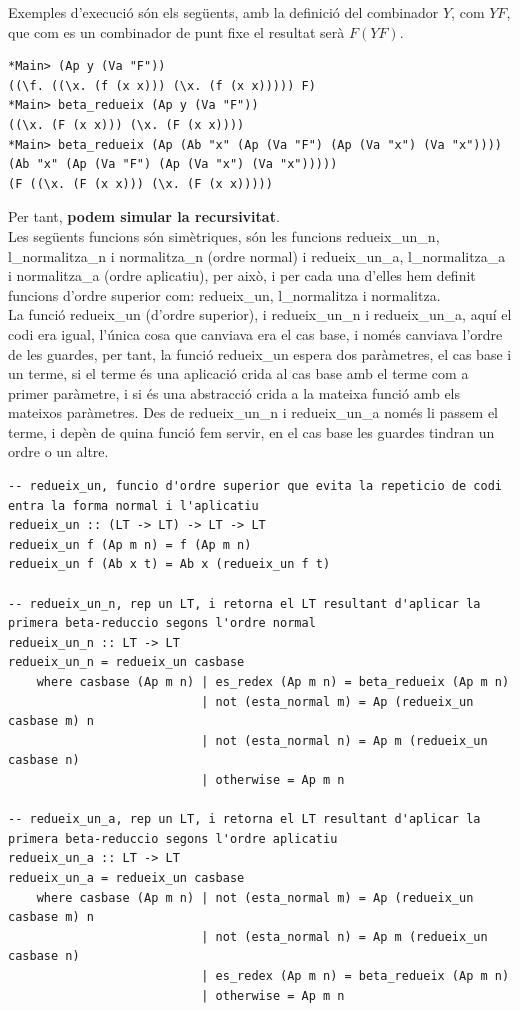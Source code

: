 \documentclass[10pt,a4paper]{article}
\begin{document}
Exemples d'execució són els següents, amb la definició del combinador $Y$, com $Y F$, que com es un combinador de punt fixe el resultat serà $F (Y F)$.

\lstset{language=Haskell, breaklines=true, basicstyle=\footnotesize}
\begin{lstlisting}[frame=mystyle]
*Main> (Ap y (Va "F"))
((\f. ((\x. (f (x x))) (\x. (f (x x))))) F)
*Main> beta_redueix (Ap y (Va "F"))
((\x. (F (x x))) (\x. (F (x x))))
*Main> beta_redueix (Ap (Ab "x" (Ap (Va "F") (Ap (Va "x") (Va "x")))) (Ab "x" (Ap (Va "F") (Ap (Va "x") (Va "x")))))
(F ((\x. (F (x x))) (\x. (F (x x)))))
\end{lstlisting}

Per tant, \textbf{podem simular la recursivitat}. \\

Les següents funcions són simètriques, són les funcions redueix\_un\_n, l\_normalitza\_n i normalitza\_n (ordre normal) i redueix\_un\_a, l\_normalitza\_a i normalitza\_a (ordre aplicatiu), per això, i per cada una d'elles hem definit funcions d'ordre superior com: redueix\_un, l\_normalitza i normalitza. \\

La funció redueix\_un (d'ordre superior), i redueix\_un\_n i redueix\_un\_a, aquí el codi era igual, l'única cosa que canviava era el cas base, i només canviava l'ordre de les guardes, per tant, la funció redueix\_un espera dos paràmetres, el cas base i un terme, si el terme és una aplicació crida al cas base amb el terme com a primer paràmetre, i si és una abstracció crida a la mateixa funció amb els mateixos paràmetres. Des de redueix\_un\_n i redueix\_un\_a només li passem el terme, i depèn de quina funció fem servir, en el cas base les guardes tindran un ordre o un altre.

\lstset{language=Haskell, breaklines=true, basicstyle=\footnotesize}
\begin{lstlisting}[frame=mystyle]
-- redueix_un, funcio d'ordre superior que evita la repeticio de codi entra la forma normal i l'aplicatiu
redueix_un :: (LT -> LT) -> LT -> LT
redueix_un f (Ap m n) = f (Ap m n)
redueix_un f (Ab x t) = Ab x (redueix_un f t)

-- redueix_un_n, rep un LT, i retorna el LT resultant d'aplicar la primera beta-reduccio segons l'ordre normal
redueix_un_n :: LT -> LT
redueix_un_n = redueix_un casbase
    where casbase (Ap m n) | es_redex (Ap m n) = beta_redueix (Ap m n)
                           | not (esta_normal m) = Ap (redueix_un casbase m) n
                           | not (esta_normal n) = Ap m (redueix_un casbase n)
                           | otherwise = Ap m n

-- redueix_un_a, rep un LT, i retorna el LT resultant d'aplicar la primera beta-reduccio segons l'ordre aplicatiu
redueix_un_a :: LT -> LT
redueix_un_a = redueix_un casbase
    where casbase (Ap m n) | not (esta_normal m) = Ap (redueix_un casbase m) n
                           | not (esta_normal n) = Ap m (redueix_un casbase n)
                           | es_redex (Ap m n) = beta_redueix (Ap m n)
                           | otherwise = Ap m n
\end{lstlisting}
\end{document}
